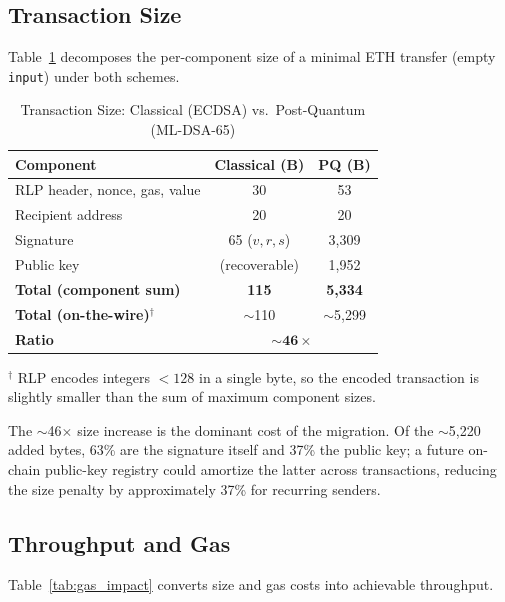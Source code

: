 \documentclass[journal,onecolumn,11pt]{IEEEtran}
\begin{document}
\subsection{Transaction Size}

Table~\ref{tab:tx_size} decomposes the per-component size of a minimal ETH transfer (empty \texttt{input}) under both schemes.

\begin{table}[!t]
\caption{Transaction Size: Classical (ECDSA) vs.\ Post-Quantum (ML-DSA-65)}
\label{tab:tx_size}
\centering
\begin{tabular}{@{}lcc@{}}
\toprule
\textbf{Component} & \textbf{Classical (B)} & \textbf{PQ (B)} \\
\midrule
RLP header, nonce, gas, value & 30 & 53 \\
Recipient address             & 20 & 20 \\
Signature                     & 65 ($v,r,s$) & 3{,}309 \\
Public key                    & (recoverable) & 1{,}952 \\
\midrule
\textbf{Total (component sum)} & \textbf{115} & \textbf{5{,}334} \\
\textbf{Total (on-the-wire)$^\dagger$} & $\sim$110 & $\sim$5{,}299 \\
\textbf{Ratio} & \multicolumn{2}{c}{$\boldsymbol{\sim 46\times}$} \\
\bottomrule
\end{tabular}

\vspace{2pt}
\footnotesize $^\dagger$ RLP encodes integers $< 128$ in a single byte, so the encoded transaction is slightly smaller than the sum of maximum component sizes.
\end{table}

The $\sim$46$\times$ size increase is the dominant cost of the migration. Of the $\sim$5{,}220 added bytes, 63\% are the signature itself and 37\% the public key; a future on-chain public-key registry could amortize the latter across transactions, reducing the size penalty by approximately 37\% for recurring senders.

\subsection{Throughput and Gas}

Table~\ref{tab:gas_impact} converts size and gas costs into achievable throughput.
\end{document}
